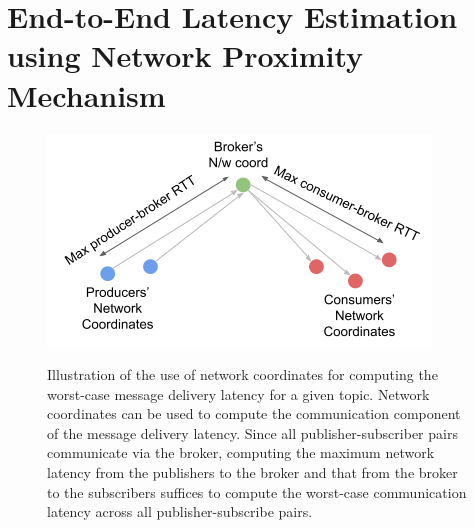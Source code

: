 \section{End-to-End Latency Estimation using Network Proximity Mechanism}
\label{sec:epulsar_nw_prox}
\begin{figure}[h]
\centering
\includegraphics[width=0.75\columnwidth]{figures/epulsar/nw_coord_latency.png}
\label{fig:nw_coord_latency}
\caption{Illustration of the use of network coordinates for computing the worst-case message delivery latency for a given topic. Network coordinates can be used to compute the communication component of the message delivery latency. Since all publisher-subscriber pairs communicate via the broker, computing the maximum network latency from the publishers to the broker and that from the broker to the subscribers suffices to compute the worst-case communication latency across all publisher-subscribe pairs.}
\end{figure}

